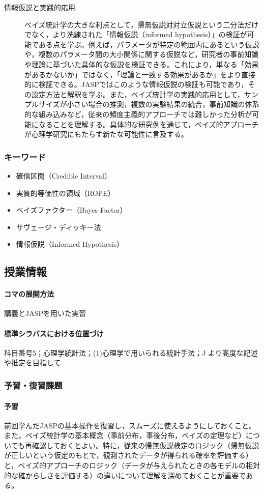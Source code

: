 \begin{description}
	\item[情報仮説と実践的応用] ベイズ統計学の大きな利点として，帰無仮説対対立仮説という二分法だけでなく，より洗練された「情報仮説（informed hypothesis）」の検証が可能である点を学ぶ。例えば，パラメータが特定の範囲内にあるという仮説や，複数のパラメータ間の大小関係に関する仮説など，研究者の事前知識や理論に基づいた具体的な仮説を検証できる。これにより，単なる「効果があるかないか」ではなく，「理論と一致する効果があるか」をより直接的に検証できる。JASPではこのような情報仮説の検証も可能であり，その設定方法と解釈を学ぶ。また，ベイズ統計学の実践的応用として，サンプルサイズが小さい場合の推測，複数の実験結果の統合，事前知識の体系的な組み込みなど，従来の頻度主義的アプローチでは難しかった分析が可能になることを理解する。具体的な研究例を通じて，ベイズ的アプローチが心理学研究にもたらす新たな可能性に言及する。

\end{description}
\subsubsection{キーワード}
\begin{itemize}
	\item 確信区間（Credible Interval）
	\item 実質的等価性の領域（ROPE）
	\item ベイズファクター（Bayes Factor）
	\item サヴェージ・ディッキー法
	\item 情報仮説（Informed Hypothesis）
\end{itemize}
\subsection{授業情報}
\paragraph{コマの展開方法}
講義とJASPを用いた実習
\paragraph{標準シラバスにおける位置づけ}
科目番号5；心理学統計法；(1)心理学で用いられる統計手法；J より高度な記述や推定を目指して
\subsubsection{予習・復習課題}
\paragraph{予習}
前回学んだJASPの基本操作を復習し，スムーズに使えるようにしておくこと。また，ベイズ統計学の基本概念（事前分布，事後分布，ベイズの定理など）についても再確認しておくとよい。特に，従来の帰無仮説検定のロジック（帰無仮説が正しいという仮定のもとで，観測されたデータが得られる確率を評価する）と，ベイズ的アプローチのロジック（データが与えられたときの各モデルの相対的な確からしさを評価する）の違いについて理解を深めておくことが重要である。

